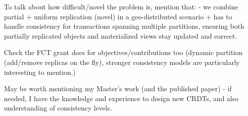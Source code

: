To talk about how difficult/novel the problem is, mention that: - we combine partial + uniform replication (novel) in a geo-distributed scenario + has to handle consistency for transactions spanning multiple partitions, ensuring both partially replicated objects and materialized views stay updated and correct.

Check the FCT grant docs for objectives/contributions too (dynamic partition (add/remove replicas on the fly), stronger consistency models are particularly interesting to mention.)

May be worth mentioning my Master's work (and the published paper) - if needed, I have the knowledge and experience to design new CRDTs, and also understanding of consistency levels.
